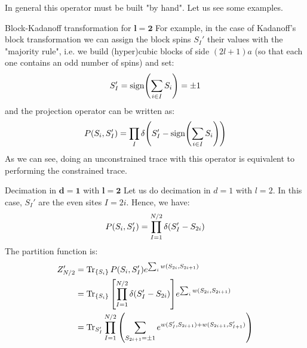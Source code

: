 \documentclass[../main/main.tex]{subfiles}
\begin{document}
In general this operator must be built "by hand". Let us see some examples.

\begin{example}{Block-Kadanoff transformation for \( \pmb{l=2} \)}{}
  For example, in the case of Kadanoff's block transformation we can assign the block spins \( S_I' \)  their values with the "majority rule", i.e. we build (hyper)cubic blocks of side \( (2l+1)a \) (so that each one contains an odd number of spins) and set:
\begin{equation*}
  S_I' = \text{sign} \qty(\sum_{i \in I}^{} S_i ) = \pm 1
\end{equation*}
and the projection operator can be written as:
\begin{equation*}
  P (S_i, S_I') = \prod_{I}^{}  \delta \qty(S_I' - \text{sign} \qty(\sum_{i \in I}^{} S_i  ) )
\end{equation*}
As we can see, doing an unconstrained trace with this operator is equivalent to performing the constrained trace.

\end{example}

\begin{example}{Decimation in \( \pmb{d=1} \) with \( \pmb{l=2} \)}{}
Let us do decimation in \( d=1 \) with \( l=2 \). In this case, \( S_I' \) are the even sites \( I=2i \). Hence, we have:
\begin{equation*}
  P (S_i, S_I') = \prod_{I=1}^{N/2} \delta \qty( S_I' - S_{2i})
\end{equation*}
The partition function is:
\begin{equation*}
\begin{split}
  Z_{N/2}' &= \Tr_{\{ S_i \}  } P (S_i, S_I') e^{\sum_{i}^{} w (S_{2i}, S_{2i+1}) }   \\
  &= \Tr_{\{ S_i \}  } \qty[ \prod_{I=1}^{N/2} \delta \qty( S_I' - S_{2i}) ]  e^{\sum_{i}^{} w (S_{2i}, S_{2i+1}) }  \\
  &= \Tr_{S_I'}   \prod_{I=1}^{N/2} \qty( \sum_{S_{2i+1} = \pm1}^{} e^{ w (S_I',S_{2i+1} ) + w (S_{2i+1}, S_{I+1}' )}   )
\end{split}
\end{equation*}


\end{example}
\end{document}

